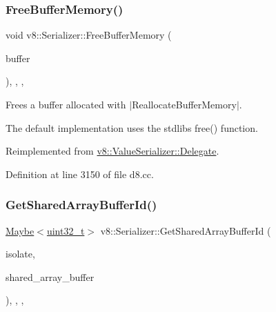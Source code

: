 \subsubsection{\texorpdfstring{Free\+Buffer\+Memory()}{FreeBufferMemory()}}
{\footnotesize\ttfamily void v8\+::\+Serializer\+::\+Free\+Buffer\+Memory (\begin{DoxyParamCaption}\item[{void $\ast$}]{buffer }\end{DoxyParamCaption})\hspace{0.3cm}{\ttfamily [inline]}, {\ttfamily [override]}, {\ttfamily [protected]}, {\ttfamily [virtual]}}

Frees a buffer allocated with $\vert$\+Reallocate\+Buffer\+Memory$\vert$.

The default implementation uses the stdlib\textquotesingle{}s {\ttfamily free()} function. 

Reimplemented from \mbox{\hyperlink{classv8_1_1ValueSerializer_1_1Delegate_a9cd4ab0061b4a26b4b0d695d31992f82}{v8\+::\+Value\+Serializer\+::\+Delegate}}.



Definition at line 3150 of file d8.\+cc.

\mbox{\label{classv8_1_1Serializer_a573f904a1db660126a98ecec16f142be}} 
\subsubsection{\texorpdfstring{Get\+Shared\+Array\+Buffer\+Id()}{GetSharedArrayBufferId()}}
{\footnotesize\ttfamily \mbox{\hyperlink{classv8_1_1Maybe}{Maybe}}$<$\mbox{\hyperlink{classuint32__t}{uint32\+\_\+t}}$>$ v8\+::\+Serializer\+::\+Get\+Shared\+Array\+Buffer\+Id (\begin{DoxyParamCaption}\item[{Isolate $\ast$}]{isolate,  }\item[{\mbox{\hyperlink{classv8_1_1Local}{Local}}$<$ \mbox{\hyperlink{classv8_1_1SharedArrayBuffer}{Shared\+Array\+Buffer}} $>$}]{shared\+\_\+array\+\_\+buffer }\end{DoxyParamCaption})\hspace{0.3cm}{\ttfamily [inline]}, {\ttfamily [override]}, {\ttfamily [protected]}, {\ttfamily [virtual]}}


